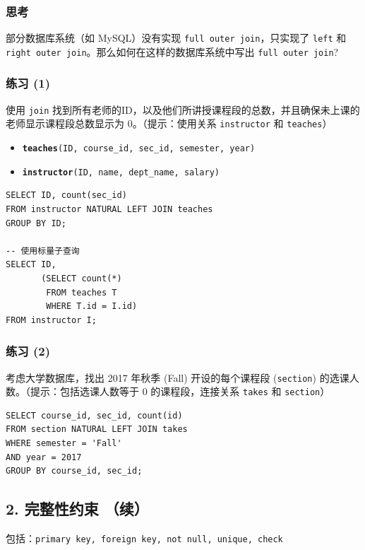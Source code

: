 \documentclass[aspectratio=169, 14pt]{beamer}
\begin{document}
\begin{frame}
    \frametitle{思考}

    部分数据库系统（如 MySQL）没有实现 \texttt{full outer join}，只实现了 \texttt{left} 和 \texttt{right outer join}。那么如何在这样的数据库系统中写出 \texttt{full outer join}?

\end{frame}

\begin{frame}
    \frametitle{练习 (1)}
使用 \texttt{join} 找到所有老师的ID，以及他们所讲授课程段的总数，并且确保未上课的老师显示课程段总数显示为 0。（提示：使用关系 \texttt{instructor} 和 \texttt{teaches}）

\begin{itemize}
    \item \texttt{\textbf{teaches}(ID, course\_id, sec\_id, semester, year)}
    \item \texttt{\textbf{instructor}(ID, name, dept\_name, salary)}
\end{itemize}
    
\end{frame}

\begin{frame}[fragile]

    \begin{verbatim}
SELECT ID, count(sec_id)
FROM instructor NATURAL LEFT JOIN teaches
GROUP BY ID;

-- 使用标量子查询
SELECT ID,
       (SELECT count(*)
        FROM teaches T
        WHERE T.id = I.id)
FROM instructor I;
    \end{verbatim}
\end{frame}

\begin{frame}[fragile]
    \frametitle{练习 (2)}

    考虑大学数据库，找出 2017 年秋季 (Fall) 开设的每个课程段 (\texttt{section}) 的选课人数。（提示：包括选课人数等于 0 的课程段，连接关系 \texttt{takes} 和 \texttt{section}）

\pause
    \begin{verbatim}
SELECT course_id, sec_id, count(id)
FROM section NATURAL LEFT JOIN takes
WHERE semester = 'Fall'
AND year = 2017
GROUP BY course_id, sec_id;
    \end{verbatim}


\end{frame}

\begin{frame}
    \section{\textcolor{darkmidnightblue}{2. 完整性约束 （续）}}
    包括：\texttt{primary key, foreign key, not null, unique, check}

\end{frame}
\end{document}
